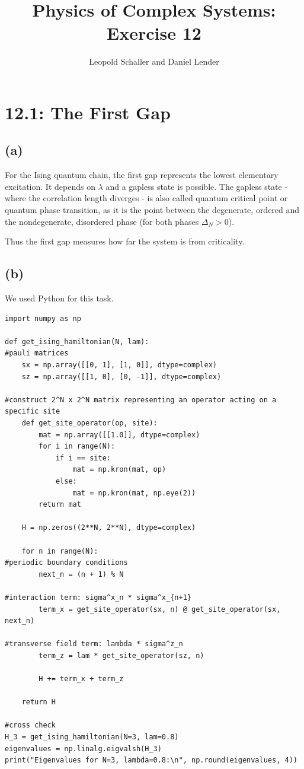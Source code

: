 \documentclass{article}
\title{Physics of Complex Systems: Exercise 12}
\author{Leopold Schaller and Daniel Lender}
\begin{document}
\maketitle

\section*{12.1: The First Gap}
\subsection*{(a)}

For the Ising quantum chain, the first gap represents the lowest elementary excitation.
It depends on $\lambda$ and a gapless state is possible. The gapless state - where the correlation length diverges - is also called quantum critical point or quantum phase transition, as it is the point between the degenerate, ordered and the nondegenerate, disordered phase (for both phases $\Delta_N>0$).

Thus the first gap measures how far the system is from criticality.

\subsection*{(b)}
We used Python for this task. 
\begin{verbatim}
import numpy as np

def get_ising_hamiltonian(N, lam):
#pauli matrices
    sx = np.array([[0, 1], [1, 0]], dtype=complex)
    sz = np.array([[1, 0], [0, -1]], dtype=complex)
                 
#construct 2^N x 2^N matrix representing an operator acting on a specific site
    def get_site_operator(op, site):
        mat = np.array([[1.0]], dtype=complex)
        for i in range(N):
            if i == site:
                mat = np.kron(mat, op)
            else:
                mat = np.kron(mat, np.eye(2))
        return mat

    H = np.zeros((2**N, 2**N), dtype=complex)
    
    for n in range(N):
#periodic boundary conditions
        next_n = (n + 1) % N
        
#interaction term: sigma^x_n * sigma^x_{n+1}
        term_x = get_site_operator(sx, n) @ get_site_operator(sx, next_n)
        
#transverse field term: lambda * sigma^z_n
        term_z = lam * get_site_operator(sz, n)
        
        H += term_x + term_z
        
    return H

#cross check
H_3 = get_ising_hamiltonian(N=3, lam=0.8)
eigenvalues = np.linalg.eigvalsh(H_3)
print("Eigenvalues for N=3, lambda=0.8:\n", np.round(eigenvalues, 4))
\end{verbatim}
\end{document}
